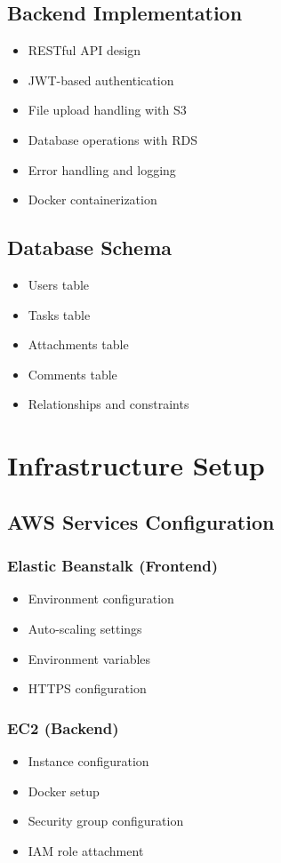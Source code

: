 \documentclass[12pt,a4paper]{article}
\begin{document}
\subsection{Backend Implementation}
\begin{itemize}
    \item RESTful API design
    \item JWT-based authentication
    \item File upload handling with S3
    \item Database operations with RDS
    \item Error handling and logging
    \item Docker containerization
\end{itemize}

\subsection{Database Schema}
\begin{itemize}
    \item Users table
    \item Tasks table
    \item Attachments table
    \item Comments table
    \item Relationships and constraints
\end{itemize}

\section{Infrastructure Setup}

\subsection{AWS Services Configuration}

\subsubsection{Elastic Beanstalk (Frontend)}
\begin{itemize}
    \item Environment configuration
    \item Auto-scaling settings
    \item Environment variables
    \item HTTPS configuration
\end{itemize}

\subsubsection{EC2 (Backend)}
\begin{itemize}
    \item Instance configuration
    \item Docker setup
    \item Security group configuration
    \item IAM role attachment
\end{itemize}
\end{document}
